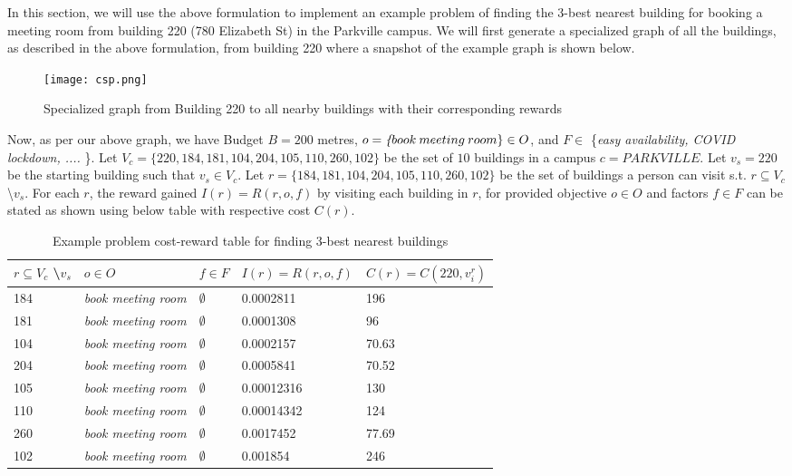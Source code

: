 In this section, we will use the above formulation to implement an example problem of finding the 3-best nearest building for booking a meeting room from building 220 (780 Elizabeth St) in the Parkville campus. We will first generate a specialized graph of all the buildings, as described in the above formulation, from building 220 where a snapshot of the example graph is shown below.

\begin{figure}[H]
\centering
  \texttt{[image: csp.png]}
  \label{fig:cop}
  \caption{Specialized graph from Building 220 to all nearby buildings with their corresponding rewards}
\end{figure}

Now, as per our above graph, we have Budget $B = 200$ metres, $o = \textit\{{book\:meeting\:room}\}\in O$, and $F \in $ \{\textit{easy availability, COVID lockdown, ....} \}. Let $V_c =\{220, 184,181,104,204,105,110,260,102\}$  be the set of $10$ buildings in a campus $c = PARKVILLE$. Let $v_s = 220$ be the starting building such that $v_s \in V_c$. Let $r = \{184,181,104,204,105,110,260,102\}$ be the set of buildings a person can visit s.t. $r \subseteq V_c$ \textbackslash\:$v_s$. For each $r$, the reward gained $I(r) = R(r,o,f)$ by visiting each building in $r$, for provided objective $o \in O$ and factors $f \in F$ can be stated as shown using below table with respective cost $C(r)$.

\begin{table}[H]
\centering
\begin{tabular}{|l|l|l|l|l|}
\hline
$r \subseteq V_c$ \textbackslash\:$v_s$   & $o \in O$                  & $f \in F$ & $I(r) = R(r,o,f)$ & $C(r) = C(220, v_i^r)$ \\ \hline
184 & \textit{book meeting room} & $\emptyset$  & 0.0002811 & 196     \\ \hline
181 & \textit{book meeting room} & $\emptyset$                     & 0.0001308 & 96     \\ \hline
104 & \textit{book meeting room} & $\emptyset$                        & 0.0002157 & 70.63    \\ \hline
204 & \textit{book meeting room} & $\emptyset$                    & 0.0005841  & 70.52   \\ \hline
105 & \textit{book meeting room} & $\emptyset$                          & 0.00012316 & 130    \\ \hline
110 & \textit{book meeting room} & $\emptyset$                          & 0.00014342 & 124    \\ \hline
260 & \textit{book meeting room} & $\emptyset$                          & 0.0017452  & 77.69   \\ \hline
102 & \textit{book meeting room} & $\emptyset$                         & 0.001854 & 246    \\ \hline
\end{tabular}
\caption{Example problem cost-reward table for finding 3-best nearest buildings}
 \label{tab:cost_reward_1}
\end{table}

